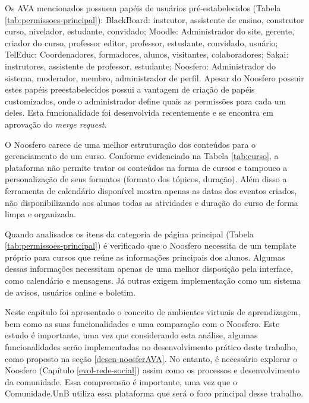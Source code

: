 Os AVA mencionados possuem papéis de usuários pré-estabelecidos (Tabela \ref{tab:permissoes-principal}): BlackBoard: instrutor, assistente de ensino, construtor curso, nivelador, estudante, convidado; Moodle: Administrador do site, gerente, criador do curso, professor editor, professor, estudante, convidado, usuário; TelEduc: Coordenadores, formadores, alunos, visitantes, colaboradores; Sakai: instrutores, assistente de professor, estudante; Noosfero: Administrador do sistema, moderador, membro, administrador de perfil. Apesar do Noosfero possuir estes papéis preestabelecidos possui a vantagem de criação de papéis customizados, onde o administrador define quais as permissões para cada um deles. Esta funcionalidade foi desenvolvida recentemente e se encontra em aprovação do \textit{merge request}.

O Noosfero carece de uma melhor estruturação dos conteúdos para o gerenciamento de um curso. Conforme evidenciado na Tabela \ref{tab:curso}, a plataforma não permite tratar os conteúdos na forma de cursos e tampouco a personalização de seus formatos (formato dos tópicos, duração). Além disso a ferramenta de calendário disponível mostra apenas as datas dos eventos criados, não disponibilizando aos alunos todas as atividades e duração do curso de forma limpa e organizada.

Quando analisados os itens da categoria de página principal (Tabela \ref{tab:permissoes-principal}) é verificado que o Noosfero necessita de um template próprio para cursos que reúne as informações principais dos alunos. Algumas dessas informações necessitam apenas de uma melhor disposição pela interface, como calendário e mensagens. Já outras exigem implementação como um sistema de avisos, usuários online e boletim.

Neste capitulo foi apresentado o conceito de ambientes virtuais de aprendizagem, bem como as  suas funcionalidades e uma comparação com o Noosfero. Este estudo é importante, uma vez que considerando esta análise, algumas funcionalidades serão implementadas no desenvolvimento prático deste trabalho, como proposto na seção \ref{desen-noosferAVA}. No entanto, é necessário explorar o Noosfero (Capítulo \ref{evol-rede-social}) assim como os processos e desenvolvimento da comunidade. Essa compreensão é importante, uma vez que o Comunidade.UnB utiliza essa plataforma que será o foco principal desse trabalho.